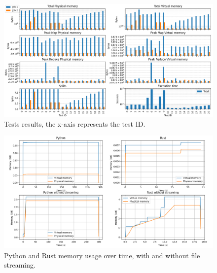 \documentclass{article}
\begin{document}
\begin{figure}[H]
    \centering
    \capstart
    \includegraphics[width=1\textwidth]{figures/experiments.png}
    \caption{Tests results, the x-axis represents the test ID.}
    \label{fig:tests_graph}
\end{figure}
\begin{figure}[H]
    \centering
    \capstart
    \includegraphics[width=1\textwidth]{figures/baseline.png}
    \caption{Python and Rust memory usage over time, with and without file streaming.}
    \label{fig:baseline}
\end{figure}
\end{document}
